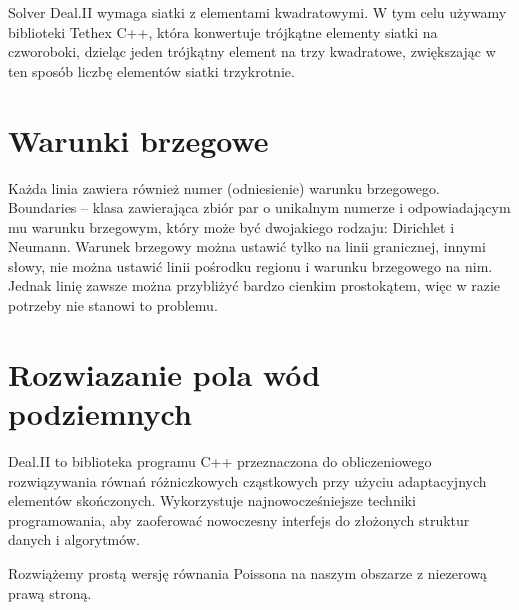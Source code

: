 \documentclass[]{pracamgr}
\begin{document}
      Solver Deal.II\cite{dealII94} wymaga siatki z elementami kwadratowymi. W tym celu używamy biblioteki Tethex \cite{tethex} C++, która konwertuje trójkątne elementy siatki na czworoboki, dzieląc jeden trójkątny element na trzy kwadratowe, zwiększając w ten sposób liczbę elementów siatki trzykrotnie.

    \section{Warunki brzegowe}

      Każda linia zawiera również numer (odniesienie) warunku brzegowego. Boundaries -- klasa zawierająca zbiór par o unikalnym numerze i odpowiadającym mu warunku brzegowym, który może być dwojakiego rodzaju: Dirichlet i Neumann. Warunek brzegowy można ustawić tylko na linii granicznej, innymi słowy, nie można ustawić linii pośrodku regionu i warunku brzegowego na nim. Jednak linię zawsze można przybliżyć bardzo cienkim prostokątem, więc w razie potrzeby nie stanowi to problemu.

    \section{Rozwiazanie pola wód podziemnych}

      Deal.II\cite{dealII94} to biblioteka programu C++ przeznaczona do obliczeniowego rozwiązywania równań różniczkowych cząstkowych przy użyciu adaptacyjnych elementów skończonych. Wykorzystuje najnowocześniejsze techniki programowania, aby zaoferować nowoczesny interfejs do złożonych struktur danych i algorytmów.

      Rozwiążemy prostą wersję równania Poissona na naszym obszarze z niezerową prawą stroną.
      
\end{document}
